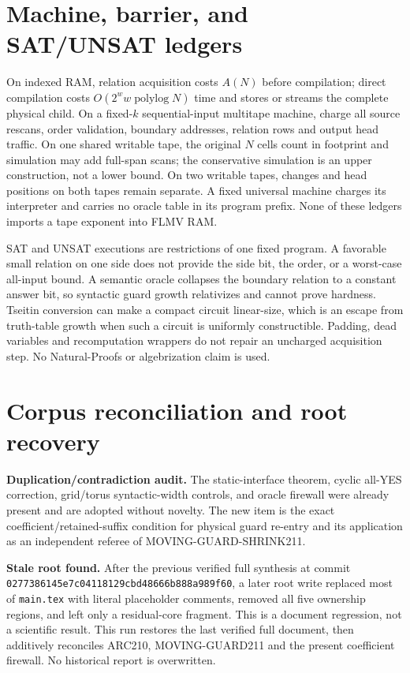 \documentclass[11pt]{article}
\begin{document}
\section{Machine, barrier, and SAT/UNSAT ledgers}
On indexed RAM, relation acquisition costs $A(N)$ before compilation; direct
compilation costs $O(2^w w\operatorname{polylog}N)$ time and stores or streams
the complete physical child.  On a fixed-$k$ sequential-input multitape
machine, charge all source rescans, order validation, boundary addresses,
relation rows and output head traffic.  On one shared writable tape, the
original $N$ cells count in footprint and simulation may add full-span scans;
the conservative simulation is an upper construction, not a lower bound.  On
two writable tapes, changes and head positions on both tapes remain separate.
A fixed universal machine charges its interpreter and carries no oracle table
in its program prefix.  None of these ledgers imports a tape exponent into
FLMV RAM.

SAT and UNSAT executions are restrictions of one fixed program.  A favorable
small relation on one side does not provide the side bit, the order, or a
worst-case all-input bound.  A semantic oracle collapses the boundary relation
to a constant answer bit, so syntactic guard growth relativizes and cannot
prove hardness.  Tseitin conversion can make a compact circuit linear-size,
which is an escape from truth-table growth when such a circuit is uniformly
constructible.  Padding, dead variables and recomputation wrappers do not
repair an uncharged acquisition step.  No Natural-Proofs or algebrization
claim is used.

\section{Corpus reconciliation and root recovery}
\textbf{Duplication/contradiction audit.}  The static-interface theorem,
cyclic all-YES correction, grid/torus syntactic-width controls, and oracle
firewall were already present and are adopted without novelty.  The new item
is the exact coefficient/retained-suffix condition for physical guard re-entry
and its application as an independent referee of MOVING-GUARD-SHRINK211.

\textbf{Stale root found.}  After the previous verified full synthesis at
commit \texttt{0277386145e7c04118129cbd48666b888a989f60}, a later root write
replaced most of \texttt{main.tex} with literal placeholder comments, removed
all five ownership regions, and left only a residual-core fragment.  This is
a document regression, not a scientific result.  This run restores the last
verified full document, then additively reconciles ARC210, MOVING-GUARD211 and
the present coefficient firewall.  No historical report is overwritten.
\end{document}
